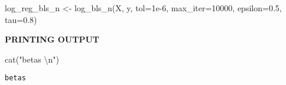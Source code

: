 \documentclass[
  letterpaper,
  DIV=11,
  numbers=noendperiod]{scrartcl}
\newenvironment{Shaded}{\begin{snugshade}}{\end{snugshade}}
\newcommand{\AttributeTok}[1]{\textcolor[rgb]{0.40,0.45,0.13}{#1}}
\newcommand{\DecValTok}[1]{\textcolor[rgb]{0.68,0.00,0.00}{#1}}
\newcommand{\FloatTok}[1]{\textcolor[rgb]{0.68,0.00,0.00}{#1}}
\newcommand{\FunctionTok}[1]{\textcolor[rgb]{0.28,0.35,0.67}{#1}}
\newcommand{\NormalTok}[1]{\textcolor[rgb]{0.00,0.23,0.31}{#1}}
\newcommand{\OtherTok}[1]{\textcolor[rgb]{0.00,0.23,0.31}{#1}}
\newcommand{\SpecialCharTok}[1]{\textcolor[rgb]{0.37,0.37,0.37}{#1}}
\newcommand{\StringTok}[1]{\textcolor[rgb]{0.13,0.47,0.30}{#1}}
\begin{document}
\begin{Shaded}
\begin{Highlighting}[]
\NormalTok{log\_reg\_bls\_n }\OtherTok{\textless{}{-}} \FunctionTok{log\_bls\_n}\NormalTok{(X, y, }\AttributeTok{tol=}\FloatTok{1e{-}6}\NormalTok{, }\AttributeTok{max\_iter=}\DecValTok{10000}\NormalTok{, }\AttributeTok{epsilon=}\FloatTok{0.5}\NormalTok{, }\AttributeTok{tau=}\FloatTok{0.8}\NormalTok{)}
\end{Highlighting}
\end{Shaded}

\textbf{PRINTING OUTPUT}

\begin{Shaded}
\begin{Highlighting}[]
\FunctionTok{cat}\NormalTok{(}\StringTok{"betas }\SpecialCharTok{\textbackslash{}n}\StringTok{"}\NormalTok{)}
\end{Highlighting}
\end{Shaded}

\begin{verbatim}
betas 
\end{verbatim}

\begin{Shaded}
\end{Shaded}
\end{document}

